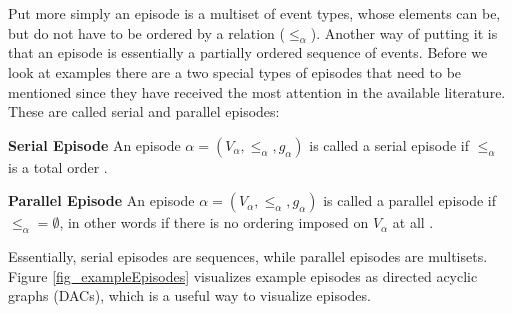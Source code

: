 Put more simply an episode is a multiset of event types, whose elements can be, but do not have to be ordered by a relation (${\leq}_{\alpha}$). Another way of putting it is that an episode is essentially a partially ordered sequence of events. Before we look at examples there are a two special types of episodes that need to be mentioned since they have received the most attention in the available literature. These are called serial and parallel episodes:

\begin{mydef}
\textbf{Serial Episode} An episode $\alpha = (V_\alpha,{\leq}_{\alpha},g_\alpha)$ is called a serial episode if ${\leq}_{\alpha}$ is a total order \cite{mannila1995discovering}.
\end{mydef}

\begin{mydef}
\textbf{Parallel Episode} An episode $\alpha = (V_\alpha,{\leq}_{\alpha},g_\alpha)$ is called a parallel episode if ${\leq}_{\alpha} = \emptyset$, in other words if there is no ordering imposed on $V_\alpha$ at all \cite{mannila1995discovering}.
\end{mydef}

Essentially, serial episodes are sequences, while parallel episodes are multisets. Figure \ref{fig_exampleEpisodes} visualizes example episodes as directed acyclic graphs (DACs), which is a useful way to visualize episodes. 



